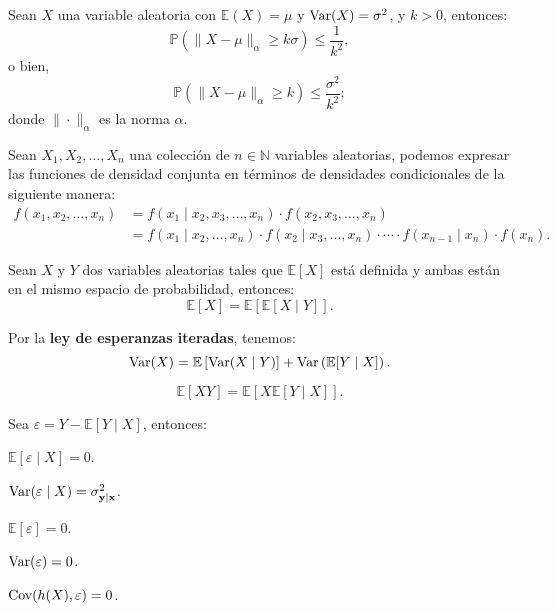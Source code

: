 \documentclass[8pt,a4paper]{extarticle}
\begin{document}
\begin{multicols}{3}
	\begin{boxtheo}
		Sean $X$ una variable aleatoria con $\mathbb{E}(X) = \mu$ y $\text{\normalfont Var}(X) = \sigma^2$, y $k > 0$, entonces:
		\[
			\mathbb{P}\left( \|X - \mu\|_{\alpha} \ge k\sigma \right) \le \frac{1}{k^2}
			,\]
		o bien,
		\[
			\mathbb{P}\left( \|X - \mu\|_{\alpha} \ge k \right) \le \frac{\sigma^2}{k^2}
			;\]
		donde $\| \cdot \|_{\alpha}$ es la norma $\alpha$.
	\end{boxtheo}

	\begin{boxrmk}[]
		Sean $X_1, X_2, \ldots, X_n$ una colección de $n\in\mathbb{N}$ variables aleatorias, podemos expresar las funciones de densidad conjunta en términos de densidades condicionales de la siguiente manera:
		\begin{align*}
			f(x_1, x_2, \ldots, x_n) & = f(x_1  \mid x_2, x_3, \ldots, x_n)\cdot  f(x_2, x_3, \ldots, x_n)                                                         \\
			                         & =  f(x_1  \mid x_2, \ldots, x_n) \cdot f(x_2  \mid x_3, \ldots, x_n) \cdot \cdots \cdot f(x_{n-1}  \mid x_n) \cdot f(x_{n})
			.\end{align*}
	\end{boxrmk}

	\begin{boxtheo}
		Sean $X$ y $Y$ dos variables aleatorias tales que $\mathbb{E}\left[ X \right] $ está definida y ambas están en el mismo espacio de probabilidad, entonces:
		\[
			\mathbb{E}\left[ X \right] = \mathbb{E}\left[ \mathbb{E}\left[ X  \mid Y \right]  \right]
			.\]
	\end{boxtheo}

	\begin{boxprop}[]
		Por la \textbf{ley de esperanzas iteradas}, tenemos:
		\[
			\text{\normalfont Var}(X) = \mathbb{E}\left[ \text{\normalfont Var}(X  \mid Y) \right] + \text{\normalfont Var} \left( \mathbb{E}[Y  \mid X] \right)
			.\]
	\end{boxprop}

	\begin{boxprop}[]
		\[
			\mathbb{E}[XY] = \mathbb{E}\left[ X \mathbb{E}[Y  \mid  X] \right]
			.\]
	\end{boxprop}

	\begin{boxprop}[]
		Sea $\varepsilon = Y - \mathbb{E}[Y \mid X]$, entonces:
		\begin{eqlist}
			\item $\mathbb{E}[\varepsilon  \mid X] = 0$.
			\item $\text{\normalfont Var}(\varepsilon  \mid X) = \sigma^2_{\mathbf{y \mid x}}$.
			\item $\mathbb{E}[\varepsilon] = 0$.
			\item $\text{\normalfont Var}(\varepsilon) = 0$.
			\item $\text{\normalfont Cov}(h(X), \varepsilon) = 0$.
		\end{eqlist}
	\end{boxprop}


\end{multicols}
\end{document}
